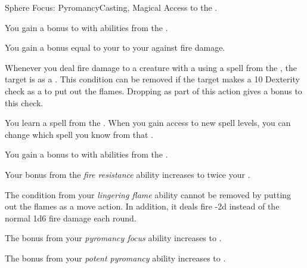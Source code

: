     \begin{feat}{Sphere Focus: Pyromancy}{Casting, Magical}
        \featpre Access to the  .

         You gain a  bonus to  with abilities from the  .

         You gain a bonus equal to your  to your  against fire damage.

         Whenever you deal fire damage to a creature with a  using a spell from the  , the target is  as a .
        This condition can be removed if the target makes a  10 Dexterity check as a  to put out the flames.
        Dropping  as part of this action gives a  bonus to this check.

         You learn a spell from the  .
        When you gain access to new spell levels, you can change which spell you know from that .

         You gain a  bonus to  with abilities from the  .

         Your bonus from the \textit{fire resistance} ability increases to twice your .

         The  condition from your \textit{lingering flame} ability cannot be removed by putting out the flames as a move action.
        In addition, it deals fire  -2d instead of the normal 1d6 fire damage each round.

         The bonus from your \textit{pyromancy focus} ability increases to .

         The bonus from your \textit{potent pyromancy} ability increases to .
    \end{feat}

